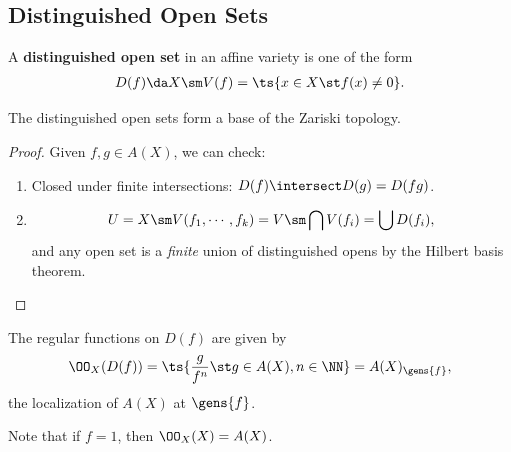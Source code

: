 \hypertarget{distinguished-open-sets}{%
\subsection{Distinguished Open Sets}\label{distinguished-open-sets}}

\begin{definition}

A \textbf{distinguished open set} in an affine variety is one of the
form
\begin{align*}  
D(f) \da X\sm V(f) = \ts{x\in X \st f(x) \neq 0}
.\end{align*}

\end{definition}

\begin{proposition}

The distinguished open sets form a base of the Zariski topology.

\end{proposition}

\begin{proof}

Given \(f, g\in A(X)\), we can check:

\begin{enumerate}
\def\labelenumi{\arabic{enumi}.}
\tightlist
\item
  Closed under finite intersections: \(D(f) \intersect D(g) = D(fg)\).
\item

  \begin{align*}U = X\sm V(f_1, \cdots, f_k) = V\sm \bigcap V(f_i) = \bigcup D(f_i),\end{align*}
  and any open set is a \emph{finite} union of distinguished opens by
  the Hilbert basis theorem.
\end{enumerate}

\end{proof}

\begin{proposition}[?]

The regular functions on \(D(f)\) are given by
\begin{align*}  
\OO_X(D(f)) = \ts{{ g \over f^n} \st g\in A(X), n\in \NN} = A(X)_{\gens{f}}
,\end{align*} the localization of \(A(X)\) at \(\gens{f}\).

\end{proposition}

Note that if \(f=1\), then \(\OO_X(X) = A(X)\).

